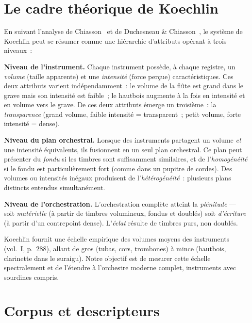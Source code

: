 \documentclass[journal]{IEEEtran}
\begin{document}
\section{Le cadre théorique de Koechlin}
\label{sec:koechlin}

En suivant l'analyse de Chiasson~\cite{Chiasson2008, ChiassonHumaniste} et de Duchesneau \& Chiasson~\cite{DuchesneauChiasson}, le système de Koechlin peut se résumer comme une hiérarchie d'attributs opérant à trois niveaux~:

\textbf{Niveau de l'instrument.} Chaque instrument possède, à chaque registre, un \textit{volume} (taille apparente) et une \textit{intensité} (force perçue) caractéristiques. Ces deux attributs varient indépendamment~: le volume de la flûte est grand dans le grave mais son intensité est faible~; le hautbois augmente à la fois en intensité et en volume vers le grave. De ces deux attributs émerge un troisième~: la \textit{transparence} (grand volume, faible intensité = transparent~; petit volume, forte intensité = dense).

\textbf{Niveau du plan orchestral.} Lorsque des instruments partagent un volume \emph{et} une intensité équivalents, ils fusionnent en un seul plan orchestral. Ce plan peut présenter du \textit{fondu} si les timbres sont suffisamment similaires, et de l'\textit{homogénéité} si le fondu est particulièrement fort (comme dans un pupitre de cordes). Des volumes ou intensités inégaux produisent de l'\textit{hétérogénéité}~: plusieurs plans distincts entendus simultanément.

\textbf{Niveau de l'orchestration.} L'orchestration complète atteint la \textit{plénitude} --- soit \textit{matérielle} (à partir de timbres volumineux, fondus et doublés) soit \textit{d'écriture} (à partir d'un contrepoint dense). L'\textit{éclat} résulte de timbres purs, non doublés.

Koechlin fournit une échelle empirique des volumes moyens des instruments (vol.~I, p.~288), allant de \og gros \fg{} (tubas, cors, trombones) à \og mince \fg{} (hautbois, clarinette dans le suraigu). Notre objectif est de mesurer cette échelle spectralement et de l'étendre à l'orchestre moderne complet, instruments avec sourdines compris.

\section{Corpus et descripteurs}
\label{sec:corpus}
\end{document}

